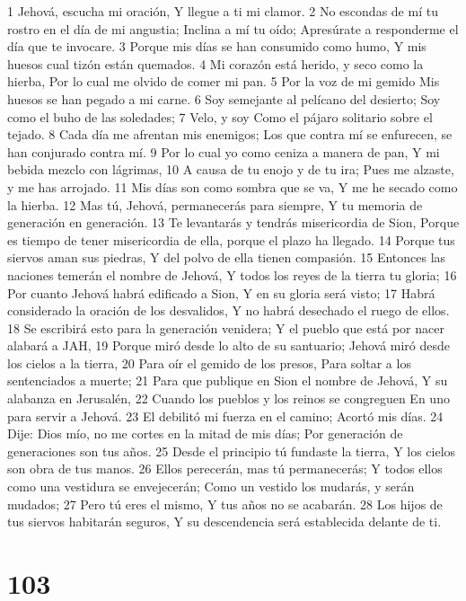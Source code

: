 1 Jehová, escucha mi oración,
Y llegue a ti mi clamor.
2 No escondas de mí tu rostro en el día de mi angustia;
Inclina a mí tu oído;
Apresúrate a responderme el día que te invocare.
3 Porque mis días se han consumido como humo,
Y mis huesos cual tizón están quemados.
4 Mi corazón está herido, y seco como la hierba,
Por lo cual me olvido de comer mi pan.
5 Por la voz de mi gemido
Mis huesos se han pegado a mi carne.
6 Soy semejante al pelícano del desierto;
Soy como el buho de las soledades;
7 Velo, y soy
Como el pájaro solitario sobre el tejado.
8 Cada día me afrentan mis enemigos;
Los que contra mí se enfurecen, se han conjurado contra mí.
9 Por lo cual yo como ceniza a manera de pan,
Y mi bebida mezclo con lágrimas,
10 A causa de tu enojo y de tu ira;
Pues me alzaste, y me has arrojado.
11 Mis días son como sombra que se va,
Y me he secado como la hierba.
12 Mas tú, Jehová, permanecerás para siempre,
Y tu memoria de generación en generación.
13 Te levantarás y tendrás misericordia de Sion,
Porque es tiempo de tener misericordia de ella, porque el plazo ha llegado.
14 Porque tus siervos aman sus piedras,
Y del polvo de ella tienen compasión.
15 Entonces las naciones temerán el nombre de Jehová,
Y todos los reyes de la tierra tu gloria;
16 Por cuanto Jehová habrá edificado a Sion,
Y en su gloria será visto;
17 Habrá considerado la oración de los desvalidos,
Y no habrá desechado el ruego de ellos.
18 Se escribirá esto para la generación venidera;
Y el pueblo que está por nacer alabará a JAH,
19 Porque miró desde lo alto de su santuario;
Jehová miró desde los cielos a la tierra,
20 Para oír el gemido de los presos,
Para soltar a los sentenciados a muerte;
21 Para que publique en Sion el nombre de Jehová,
Y su alabanza en Jerusalén,
22 Cuando los pueblos y los reinos se congreguen
En uno para servir a Jehová.
23 El debilitó mi fuerza en el camino;
Acortó mis días.
24 Dije: Dios mío, no me cortes en la mitad de mis días;
Por generación de generaciones son tus años.
25 Desde el principio tú fundaste la tierra,
Y los cielos son obra de tus manos.
26 Ellos perecerán, mas tú permanecerás;
Y todos ellos como una vestidura se envejecerán;
Como un vestido los mudarás, y serán mudados;
27 Pero tú eres el mismo,
Y tus años no se acabarán.
28 Los hijos de tus siervos habitarán seguros,
Y su descendencia será establecida delante de ti.

\chapter{103}

